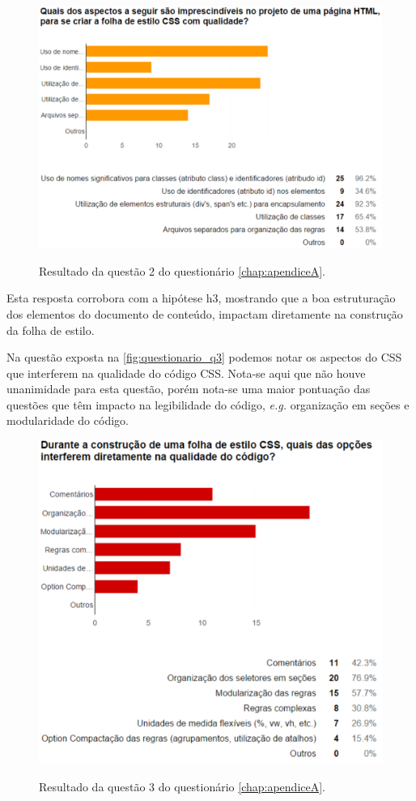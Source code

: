 \begin{figure}[!htb]
	\centering
	\caption{Resultado da questão 2 do questionário \autoref{chap:apendiceA}.}
	\includegraphics[width=1\textwidth]{./04-figuras/questionario_q2}
	\label{fig:questionario_q2}
\end{figure}

Esta resposta corrobora com a hipótese h3, mostrando que a boa estruturação dos elementos do documento de conteúdo, impactam diretamente na construção da folha de estilo.

Na questão exposta na \autoref{fig:questionario_q3} podemos notar os aspectos do CSS que interferem na qualidade do código CSS. Nota-se aqui que não houve unanimidade para esta questão, porém nota-se uma maior pontuação das questões que têm impacto na legibilidade do código, \textit{e.g.} organização em seções e modularidade do código.

\begin{figure}[!htb]
	\centering
	\caption{Resultado da questão 3 do questionário \autoref{chap:apendiceA}.}
	\includegraphics[width=1\textwidth]{./04-figuras/questionario_q3}
	\label{fig:questionario_q3}
\end{figure}


